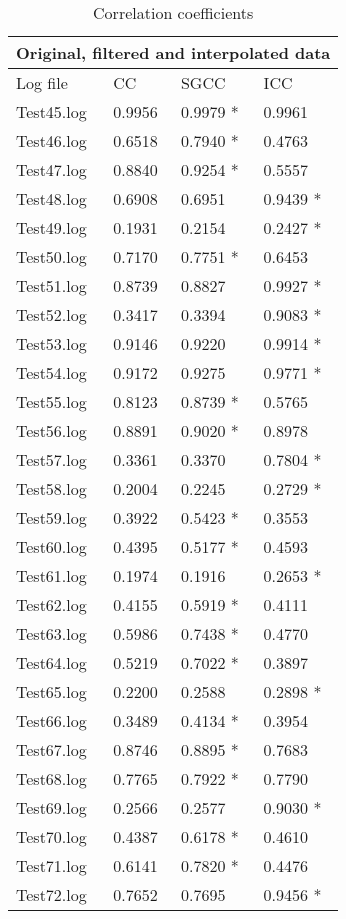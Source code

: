 \begin{table}[]
\centering
\begin{tabular}{|l|l|l|l|}
\hline
\multicolumn{4}{|l|}{Original, filtered and interpolated data} \\ \hline
Log file  &  CC & SGCC & ICC \\ \hline
Test45.log & 0.9956 & 0.9979 * & 0.9961 \\ \hline
Test46.log & 0.6518 & 0.7940 * & 0.4763 \\ \hline
Test47.log & 0.8840 & 0.9254 * & 0.5557 \\ \hline
Test48.log & 0.6908 & 0.6951 & 0.9439 * \\ \hline
Test49.log & 0.1931 & 0.2154 & 0.2427 * \\ \hline
Test50.log & 0.7170 & 0.7751 * & 0.6453 \\ \hline
Test51.log & 0.8739 & 0.8827 & 0.9927 * \\ \hline
Test52.log & 0.3417 & 0.3394 & 0.9083 * \\ \hline
Test53.log & 0.9146 & 0.9220 & 0.9914 * \\ \hline
Test54.log & 0.9172 & 0.9275 & 0.9771 * \\ \hline
Test55.log & 0.8123 & 0.8739 * & 0.5765 \\ \hline
Test56.log & 0.8891 & 0.9020 * & 0.8978 \\ \hline
Test57.log & 0.3361 & 0.3370 & 0.7804 * \\ \hline
Test58.log & 0.2004 & 0.2245 & 0.2729 * \\ \hline
Test59.log & 0.3922 & 0.5423 * & 0.3553 \\ \hline
Test60.log & 0.4395 & 0.5177 * & 0.4593 \\ \hline
Test61.log & 0.1974 & 0.1916 & 0.2653 * \\ \hline
Test62.log & 0.4155 & 0.5919 * & 0.4111 \\ \hline
Test63.log & 0.5986 & 0.7438 * & 0.4770 \\ \hline
Test64.log & 0.5219 & 0.7022 * & 0.3897 \\ \hline
Test65.log & 0.2200 & 0.2588 & 0.2898 * \\ \hline
Test66.log & 0.3489 & 0.4134 * & 0.3954 \\ \hline
Test67.log & 0.8746 & 0.8895 * & 0.7683 \\ \hline
Test68.log & 0.7765 & 0.7922 * & 0.7790 \\ \hline
Test69.log & 0.2566 & 0.2577 & 0.9030 * \\ \hline
Test70.log & 0.4387 & 0.6178 * & 0.4610 \\ \hline
Test71.log & 0.6141 & 0.7820 * & 0.4476 \\ \hline
Test72.log & 0.7652 & 0.7695 & 0.9456 * \\ \hline

\end{tabular}
\caption{Correlation coefficients}
\label{table:kysymys}
\end{table}
